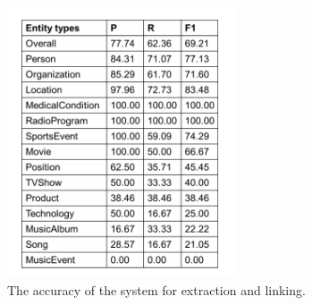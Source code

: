\begin{figure}[H]
\centering
\includegraphics[height=8cm]{Classification_entities}
\caption{The accuracy of the system for extraction and linking.}
\label{fig:classification_entities}
\end{figure}